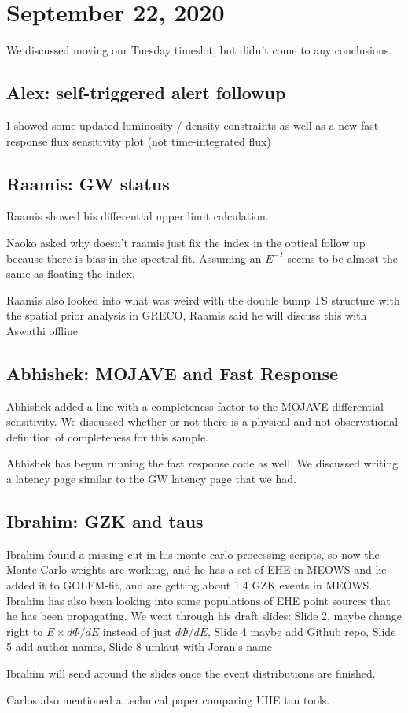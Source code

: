 \chapter{September 22, 2020}
We discussed moving our Tuesday timeslot, but didn't come to any conclusions.

\section{Alex: self-triggered alert followup}
I showed some updated luminosity / density constraints as well as a new fast response flux sensitivity plot (not time-integrated flux)

\section{Raamis: GW status}
Raamis showed his differential upper limit calculation.

Naoko asked why doesn't raamis just fix the index in the optical follow up because there is bias in the spectral fit. Assuming an $E^{-2}$ seems to be almost the same as floating the index.

Raamis also looked into what was weird with the double bump TS structure with the spatial prior analysis in GRECO, Raamis said he will discuss this with Aswathi offline

\section{Abhishek: MOJAVE and Fast Response}
Abhishek added a line with a completeness factor to the MOJAVE differential sensitivity. We discussed whether or not there is a physical and not observational definition of completeness for this sample.

Abhishek has begun running the fast response code as well. We discussed writing a latency page similar to the GW latency page that we had.

\section{Ibrahim: GZK and taus}
Ibrahim found a missing cut in his monte carlo processing scripts, so now the Monte Carlo weights are working, and he has a set of EHE in MEOWS and he added it to GOLEM-fit, and are getting about 1.4 GZK events in MEOWS. Ibrahim has also been looking into some populations of EHE point sources that he has been propagating. 
We went through his draft slides: Slide 2, maybe change right to $E \times d\Phi/dE$ instead of just $d\Phi/dE$, Slide 4 maybe add Github repo, Slide 5 add author names, Slide 8 umlaut with Joran's name

Ibrahim will send around the slides once the event distributions are finished.

Carlos also mentioned a technical paper comparing UHE tau tools.